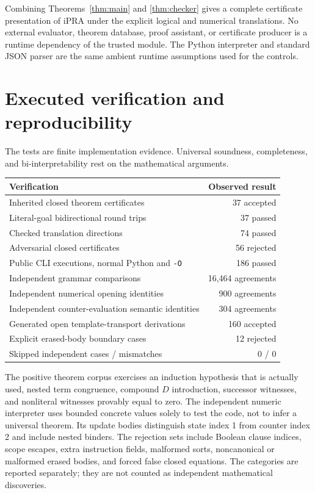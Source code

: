 \documentclass[10pt,letterpaper]{article}
\theoremstyle{definition}
\theoremstyle{remark}
\begin{document}
Combining Theorems~\ref{thm:main} and \ref{thm:checker} gives a complete
certificate presentation of iPRA under the explicit logical and numerical
translations. No external evaluator, theorem database, proof assistant,
or certificate producer is a runtime dependency of the trusted module.
The Python interpreter and standard JSON parser are the same ambient
runtime assumptions used for the controls.

\section{Executed verification and reproducibility}\label{sec:verification}

The tests are finite implementation evidence. Universal soundness,
completeness, and bi-interpretability rest on the mathematical arguments.

\begin{center}
\small
\begin{tabular}{@{}lr@{}}
\toprule
Verification & Observed result\\
\midrule
Inherited closed theorem certificates & 37 accepted\\
Literal-goal bidirectional round trips & 37 passed\\
Checked translation directions & 74 passed\\
Adversarial closed certificates & 56 rejected\\
Public CLI executions, normal Python and \texttt{-O} & 186 passed\\
Independent grammar comparisons & 16,464 agreements\\
Independent numerical opening identities & 900 agreements\\
Independent counter-evaluation semantic identities & 304 agreements\\
Generated open template-transport derivations & 160 accepted\\
Explicit erased-body boundary cases & 12 rejected\\
Skipped independent cases / mismatches & 0 / 0\\
\bottomrule
\end{tabular}
\end{center}

The positive theorem corpus exercises an induction hypothesis that is
actually used, nested term congruence, compound $D$ introduction, successor
witnesses, and nonliteral witnesses provably equal to zero. The independent
numeric interpreter uses bounded concrete values solely to test the code,
not to infer a universal theorem. Its update bodies distinguish state
index 1 from counter index 2 and include nested binders. The rejection
sets include Boolean clause indices, scope escapes, extra instruction
fields, malformed sorts, noncanonical or malformed erased bodies, and
forced false closed equations. The categories are reported separately;
they are not counted as independent mathematical discoveries.
\end{document}
